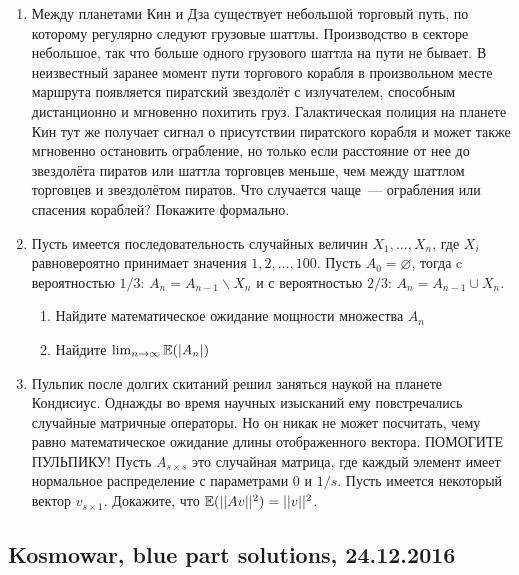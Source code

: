 \documentclass[12pt, a4paper]{article}\usepackage[]{graphicx}\usepackage[]{color}
\begin{document}
						\begin{enumerate}
							\item Между планетами Кин и Дза существует небольшой торговый путь, по которому регулярно следуют грузовые шаттлы. Производство в секторе небольшое, так что больше одного грузового шаттла на пути не бывает. В неизвестный заранее момент пути торгового корабля в произвольном месте маршрута появляется пиратский звездолёт с излучателем, способным дистанционно и мгновенно похитить груз. Галактическая полиция на планете Кин тут же получает сигнал о присутствии пиратского корабля и может также мгновенно остановить ограбление, но только если расстояние от нее до звездолёта пиратов или шаттла торговцев меньше, чем между шаттлом торговцев и звездолётом пиратов. Что случается чаще~--- ограбления или спасения кораблей? Покажите формально.

							\item Пусть имеется последовательность случайных величин $X_1, \ldots, X_n$, где $X_i$ равновероятно принимает значения $1, 2, \ldots, 100$. Пусть $A_0 = \varnothing$, тогда c вероятностью $1/3$: $A_n = A_{n-1} \backslash X_n$ и с вероятностью $2/3$: $A_n = A_{n-1} \cup X_n$.

							\begin{enumerate}
								\item Найдите математическое ожидание мощности множества $A_n$
								\item Найдите $\lim_{n \rightarrow \infty} \mathbb{E} (|A_n|)$
							\end{enumerate}

							\item  Пульпик после долгих скитаний решил заняться наукой на планете Кондисиус. Однажды во время научных изысканий ему повстречались случайные матричные операторы. Но он никак не может посчитать, чему равно математическое ожидание длины отображенного вектора. ПОМОГИТЕ ПУЛЬПИКУ! Пусть $A_{s \times s}$ это случайная матрица, где каждый элемент имеет нормальное распределение с параметрами $0$ и $1/s$. Пусть имеется некоторый вектор $v_{s \times 1}$. Докажите, что $\mathbb{E}(||Av||^2) = ||v||^2$.
						\end{enumerate}

						\subsection{Kosmowar, blue part solutions, 24.12.2016}
\end{document}
